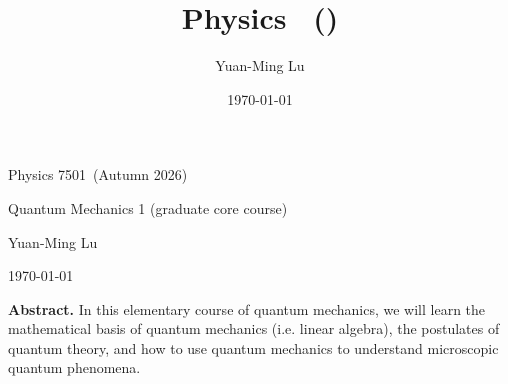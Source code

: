 \documentclass[
  11pt,
  open=any,           %
  bibliography=totoc, %
  numbers=noenddot    %
]{scrbook}
\title{Physics \CourseNo\ (\Semester)\\ \CourseTitle}
\author{Yuan-Ming Lu}
\date{\today}
\theoremstyle{plain}
\def\CourseNo{7501}
\def\CourseTitle{Quantum Mechanics 1 (graduate core course)}
\def\Semester{Autumn 2026}
\begin{document}
\frontmatter

\begin{center}
{\LARGE Physics \CourseNo\ (\Semester)\par}
\vspace{0.5em}
{\LARGE \CourseTitle\par}
\vspace{1.5em}
{\large Yuan-Ming Lu\par}
\vspace{1em}
{\large \today\par}
\end{center}

\bigskip
\noindent\textbf{Abstract.} In this elementary course of quantum mechanics, we will learn the mathematical basis of quantum mechanics (i.e. linear algebra), the postulates of quantum theory, and how to use quantum mechanics to understand microscopic quantum phenomena.

\clearpage

\tableofcontents
\clearpage

\mainmatter
\setcounter{chapter}{-1}






%



\backmatter


\end{document}
